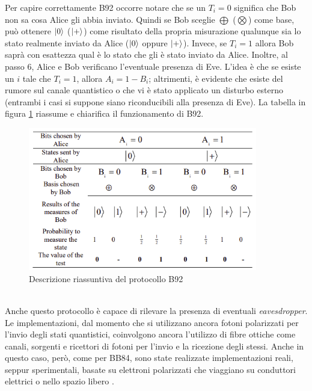 Per capire correttamente B92 occorre notare che se un $T_i = 0$ significa che Bob non sa cosa Alice gli abbia inviato. Quindi se Bob sceglie $\bigoplus$ ($\bigotimes$) come base, può ottenere $\ket{0}$ ($\ket{+}$) come risultato della propria misurazione qualunque sia lo stato realmente inviato da Alice ($\ket{0}$ oppure $\ket{+}$). Invece, se $T_i = 1$ allora Bob saprà con esattezza qual è lo stato che gli è stato inviato da Alice. Inoltre, al passo 6, Alice e Bob verificano l'eventuale presenza di Eve. L'idea è che se esiste un $i$ tale che $T_i = 1$, allora $A_i = 1 - B_i$; altrimenti, è evidente che esiste del rumore sul canale quantistico o che vi è stato applicato un disturbo esterno (entrambi i casi si suppone siano riconducibili alla presenza di Eve). La tabella in figura \ref{fig:tab_b92} riassume e chiarifica il funzionamento di B92.
\begin{figure}[h]
    \centering
    \includegraphics[width=10cm]{immagini/tab_b92.png}
    \caption{Descrizione riassuntiva del protocollo B92 \cite{elboukhari}}
    \label{fig:tab_b92}
\end{figure}\\
Anche questo protocollo è capace di rilevare la presenza di eventuali \textit{eavesdropper}. Le implementazioni, dal momento che si utilizzano ancora fotoni polarizzati per l'invio degli stati quantistici, coinvolgono ancora l'utilizzo di fibre ottiche come canali, sorgenti e ricettori di fotoni per l'invio e la ricezione degli stessi. Anche in questo caso, però, come per BB84, sono state realizzate implementazioni reali, seppur sperimentali, basate su elettroni polarizzati che viaggiano su conduttori elettrici o nello spazio libero \cite{knight} \cite{hughes}.

